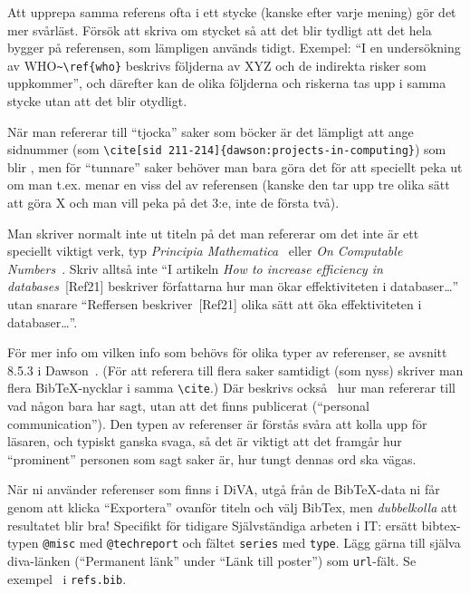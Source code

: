 Att upprepa samma referens ofta i ett stycke (kanske efter varje mening) gör det mer svårläst. Försök att skriva om stycket så att det blir tydligt att det hela bygger på referensen, som lämpligen används tidigt. Exempel: ``I en undersökning av WHO\verb|~\ref{who}| beskrivs följderna av XYZ och de indirekta risker som uppkommer'', och därefter kan de olika följderna och riskerna tas upp i samma stycke utan att det blir otydligt.

När man refererar till ``tjocka'' saker som böcker är det lämpligt att ange sidnummer 
(som \verb|\cite[sid 211-214]{dawson:projects-in-computing}|) som blir \cite[sid 211-214]{dawson:projects-in-computing}, men för ``tunnare'' saker behöver man bara göra det för att speciellt peka ut om man t.ex. menar en viss del av referensen (kanske den tar upp tre olika sätt att göra X och man vill peka på det 3:e, inte de första två).

Man skriver normalt inte ut titeln på det man refererar om det inte är ett speciellt viktigt verk, typ \emph{Principia Mathematica}~\cite{whitehead.russel:principia-mathematica} eller \emph{On Computable Numbers}~\cite{turing:computable-numbers}. Skriv alltså inte ``I artikeln \emph{How to increase efficiency in databases}~[Ref21] beskriver författarna hur man ökar effektiviteten i databaser\ldots'' utan snarare ``Reffersen beskriver~[Ref21] olika sätt att öka effektiviteten i databaser\ldots''.

För mer info om vilken info som behövs för olika typer av referenser, se avsnitt 8.5.3 i Dawson~\cite{dawson:projects-in-computing,dawson:projects-in-computing-old}. (För att referera till flera saker samtidigt (som nyss) skriver man flera BibTeX-nycklar i samma \verb|\cite|.) 
Där beskrivs också~\cite[sid 230]{dawson:projects-in-computing} hur man refererar till vad någon bara har sagt, utan att det finns publicerat (``personal communication''). Den typen av referenser är förstås svåra att kolla upp för läsaren, och typiskt ganska svaga, så det är viktigt att det framgår hur ``prominent'' personen som sagt saker är, hur tungt dennas ord ska vägas.

När ni använder referenser som finns i DiVA, utgå från de Bib\TeX-data ni får genom att klicka ``Exportera'' ovanför titeln och välj BibTex, men \emph{dubbelkolla} att resultatet blir bra! Specifikt för tidigare Självständiga arbeten i IT: ersätt bibtex-typen \verb|@misc| med \verb|@techreport| och fältet \verb|series| med \verb|type|. Lägg gärna till själva diva-länken (``Permanent länk'' under ``Länk till poster'') som \verb|url|-fält. Se exempel~\cite{Brane973772,Alstergren1439802} i \texttt{refs.bib}.


